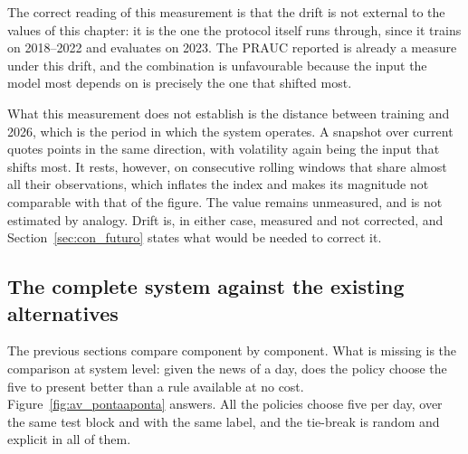 The correct reading of this measurement is that the drift is not external to the values of this
chapter: it is the one the protocol itself runs through, since it trains on 2018--2022 and evaluates
on 2023. The \gls{PRAUC} reported is already a measure under this drift, and the combination is
unfavourable because the input the model most depends on is precisely the one that shifted most.

What this measurement does not establish is the distance between training and 2026, which is the
period in which the system operates. A snapshot over current quotes points in the same direction,
with volatility again being the input that shifts most. It rests, however, on consecutive rolling
windows that share almost all their observations, which inflates the index and makes its magnitude
not comparable with that of the figure. The value remains unmeasured, and is not estimated by
analogy. Drift is, in either case, measured and not corrected, and Section~\ref{sec:con_futuro}
states what would be needed to correct it.

\subsection{The complete system against the existing alternatives}

The previous sections compare component by component. What is missing is the comparison at system
level: given the news of a day, does the policy choose the five to present better than a rule
available at no cost. Figure~\ref{fig:av_pontaaponta} answers. All the policies choose five per
day, over the same test block and with the same label, and the tie-break is random and explicit in
all of them.

